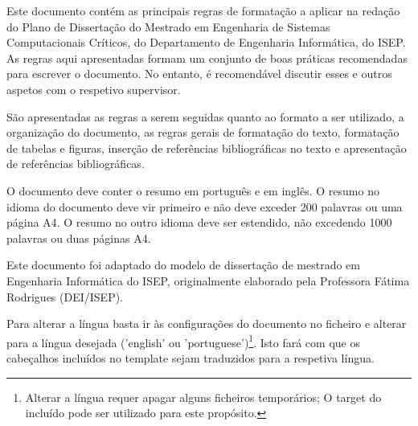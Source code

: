 
\begin{abstractotherlanguage}

  Este documento contém as principais regras de formatação a aplicar na redação do Plano de Dissertação do Mestrado em Engenharia de Sistemas Computacionais Críticos, do Departamento de Engenharia Informática, do ISEP. As regras aqui apresentadas formam um conjunto de boas práticas recomendadas para escrever o documento. No entanto, é recomendável discutir esses e outros aspetos com o respetivo supervisor.

  São apresentadas as regras a serem seguidas quanto ao formato a ser utilizado, a organização do documento, as regras gerais de formatação do texto, formatação de tabelas e figuras, inserção de referências bibliográficas no texto e apresentação de referências bibliográficas.

  O documento deve conter o resumo em português e em inglês. O resumo no idioma do documento deve vir primeiro e não deve exceder 200 palavras ou uma página A4. O resumo no outro idioma deve ser estendido, não excedendo 1000 palavras ou duas páginas A4.

  Este documento foi adaptado do modelo de dissertação de mestrado em Engenharia Informática do ISEP, originalmente elaborado pela Professora Fátima Rodrigues (DEI/ISEP).

  Para alterar a língua basta ir às configurações do documento no ficheiro  e alterar para a língua desejada ('english' ou 'portuguese')\footnote{Alterar a língua requer apagar alguns ficheiros temporários; O target  do  incluído pode ser utilizado para este propósito.}. Isto fará com que os cabeçalhos incluídos no template sejam traduzidos para a respetiva língua.

\end{abstractotherlanguage}



